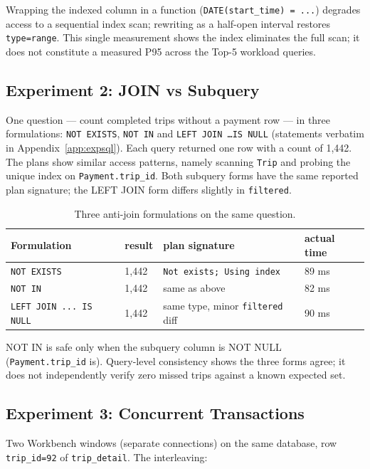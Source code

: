 Wrapping the indexed column in a function (\texttt{DATE(start\_time) = ...}) degrades access to a sequential index scan; rewriting as a half-open interval restores \texttt{type=range}. This single measurement shows the index eliminates the full scan; it does not constitute a measured P95 across the Top-5 workload queries.

\subsection{Experiment 2: JOIN vs Subquery}
One question --- count completed trips without a payment row --- in three formulations: \texttt{NOT EXISTS}, \texttt{NOT IN} and \texttt{LEFT JOIN \ldots IS NULL} (statements verbatim in Appendix~\ref{app:expsql}).
Each query returned one row with a count of 1{,}442. The plans show similar access patterns, namely scanning \texttt{Trip} and probing the unique index on \texttt{Payment.trip\_id}. Both subquery forms have the same reported plan signature; the LEFT JOIN form differs slightly in \texttt{filtered}.

\begin{table}[h]
\centering
\caption{Three anti-join formulations on the same question.}
\label{tab:exp2}
\small
\begin{tabular}{@{}llll@{}}
\toprule
Formulation & result & plan signature & actual time \\
\midrule
\texttt{NOT EXISTS}          & 1{,}442 & \texttt{Not exists; Using index} & 89 ms \\
\texttt{NOT IN}              & 1{,}442 & same as above & 82 ms \\
\texttt{LEFT JOIN ... IS NULL} & 1{,}442 & same type, minor \texttt{filtered} diff & 90 ms \\
\bottomrule
\end{tabular}
\end{table}

NOT IN is safe only when the subquery column is NOT NULL (\texttt{Payment.trip\_id} is). Query-level consistency shows the three forms agree; it does not independently verify zero missed trips against a known expected set.

\subsection{Experiment 3: Concurrent Transactions}
Two Workbench windows (separate connections) on the same database, row \texttt{trip\_id=92} of \texttt{trip\_detail}. The interleaving:

